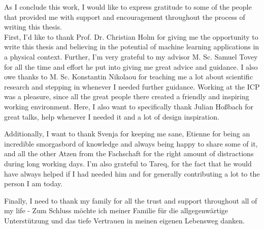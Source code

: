 As I conclude this work, I would like to express gratitude to some of the people that provided me with support and encouragement throughout the process of writing this thesis.\\
First, I'd like to thank Prof. Dr. Christian Holm for giving me the opportunity to write this thesis and believing in the potential of machine learning applications in a physical context. Further, I'm very grateful to my advisor M. Sc. Samuel Tovey for all the time and effort he put into giving me great advice and guidance. I also owe thanks to M. Sc. Konstantin Nikolaou for teaching me a lot about scientific research and stepping in whenever I needed further guidance. Working at the ICP was a pleasure, since all the great people there created a friendly and inspiring working environment. Here, I also want to specifically thank Julian Ho\ss bach for great talks, help whenever I needed it and a lot of design inspiration.\\\par
Additionally, I want to thank Svenja for keeping me sane, Etienne for being an incredible smorgasbord of knowledge and always being happy to share some of it, and all the other Atzen from the Fachschaft for the right amount of distractions during long working days. I'm also grateful to Tareq, for the fact that he would have always helped if I had needed him and for generally contributing a lot to the person I am today.\\\par
Finally, I need to thank my family for all the trust and support throughout all of my life - Zum Schluss möchte ich meiner Familie für die allgegenwärtige Unterstützung und das tiefe Vertrauen in meinen eigenen Lebensweg danken.